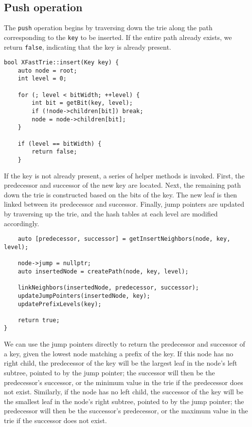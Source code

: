 \subsection{Push operation}
The \texttt{push} operation begins by traversing down the trie along the path corresponding to the \texttt{key} to be inserted. If the entire path already exists, we return \texttt{false}, indicating that the key is already present.

\begin{verbatim}
bool XFastTrie::insert(Key key) {
    auto node = root;
    int level = 0;

    for (; level < bitWidth; ++level) {
        int bit = getBit(key, level);
        if (!node->children[bit]) break;
        node = node->children[bit];
    }

    if (level == bitWidth) {
        return false;
    }
\end{verbatim}

If the key is not already present, a series of helper methods is invoked. First, the predecessor and successor of the new key are located. Next, the remaining path down the trie is constructed based on the bits of the key. The new leaf is then linked between its predecessor and successor. Finally, jump pointers are updated by traversing up the trie, and the hash tables at each level are modified accordingly.

\begin{verbatim}
    auto [predecessor, successor] = getInsertNeighbors(node, key, level);

    node->jump = nullptr;
    auto insertedNode = createPath(node, key, level);

    linkNeighbors(insertedNode, predecessor, successor);
    updateJumpPointers(insertedNode, key);
    updatePrefixLevels(key);

    return true;
}
\end{verbatim}

We can use the jump pointers directly to return the predecessor and successor of a key, given the lowest node matching a prefix of the key. If this node has no right child, the predecessor of the key will be the largest leaf in the node's left subtree, pointed to by the jump pointer; the successor will then be the predecessor's successor, or the minimum value in the trie if the predecessor does not exist. Similarly, if the node has no left child, the successor of the key will be the smallest leaf in the node's right subtree, pointed to by the jump pointer; the predecessor will then be the successor's predecessor, or the maximum value in the trie if the successor does not exist.

